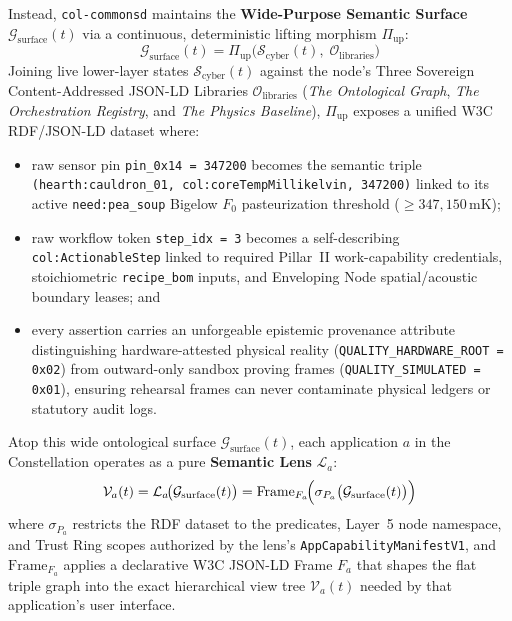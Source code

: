 Instead, \texttt{col-commonsd} maintains the \textbf{Wide-Purpose Semantic Surface}
$\mathcal{G}_{\mathrm{surface}}(t)$ via a continuous, deterministic lifting morphism
$\Pi_{\mathrm{up}}$:
\begin{equation}
    \mathcal{G}_{\mathrm{surface}}(t) = \Pi_{\mathrm{up}}\!\bigl(\mathcal{S}_{\mathrm{cyber}}(t),\; \mathcal{O}_{\mathrm{libraries}}\bigr)
    \label{eq:semantic-lifting}
\end{equation}
Joining live lower-layer states $\mathcal{S}_{\mathrm{cyber}}(t)$ against the node's Three
Sovereign Content-Addressed JSON-LD Libraries $\mathcal{O}_{\mathrm{libraries}}$ (\textit{The
Ontological Graph}, \textit{The Orchestration Registry}, and \textit{The Physics Baseline}),
$\Pi_{\mathrm{up}}$ exposes a unified W3C RDF/JSON-LD dataset where:
\begin{itemize}
    \item raw sensor pin \texttt{pin\_0x14 = 347200} becomes the semantic triple
          \texttt{(hearth:cauldron\_01, col:coreTempMillikelvin, 347200)} linked to its active
          \texttt{need:pea\_soup} Bigelow $F_0$ pasteurization threshold
          ($\ge 347{,}150\,\mathrm{mK}$);
    \item raw workflow token \texttt{step\_idx = 3} becomes a self-describing
          \texttt{col:ActionableStep} linked to required Pillar~II work-capability credentials,
          stoichiometric \texttt{recipe\_bom} inputs, and Enveloping Node spatial/acoustic boundary
          leases; and
    \item every assertion carries an unforgeable epistemic provenance attribute distinguishing
          hardware-attested physical reality (\texttt{QUALITY\_HARDWARE\_ROOT = 0x02}) from
          outward-only sandbox proving frames (\texttt{QUALITY\_SIMULATED = 0x01}), ensuring
          rehearsal frames can never contaminate physical ledgers or statutory audit logs.
\end{itemize}

Atop this wide ontological surface $\mathcal{G}_{\mathrm{surface}}(t)$, each application $a$ in
the Constellation operates as a pure \textbf{Semantic Lens} $\mathcal{L}_a$:
\begin{equation}
    \mathcal{V}_a(t) = \mathcal{L}_a\!\bigl(\mathcal{G}_{\mathrm{surface}}(t)\bigr) = \mathrm{Frame}_{F_a}\!\Bigl(\sigma_{P_a}\bigl(\mathcal{G}_{\mathrm{surface}}(t)\bigr)\Bigr)
    \label{eq:lens-projection}
\end{equation}
where $\sigma_{P_a}$ restricts the RDF dataset to the predicates, Layer~5 node namespace, and
Trust Ring scopes authorized by the lens's \texttt{AppCapabilityManifestV1}, and
$\mathrm{Frame}_{F_a}$ applies a declarative W3C JSON-LD Frame $F_a$ \parencite{w3c2020jsonld}
that shapes the flat triple graph into the exact hierarchical view tree $\mathcal{V}_a(t)$ needed
by that application's user interface.


